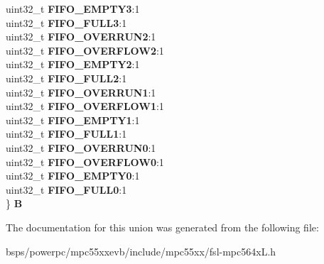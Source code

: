 \begin{DoxyCompactItemize}
\begin{tabbing}
\>uint32\_t {\bfseries FIFO\_EMPTY3}:1\\
\>uint32\_t {\bfseries FIFO\_FULL3}:1\\
\>uint32\_t {\bfseries FIFO\_OVERRUN2}:1\\
\>uint32\_t {\bfseries FIFO\_OVERFLOW2}:1\\
\>uint32\_t {\bfseries FIFO\_EMPTY2}:1\\
\>uint32\_t {\bfseries FIFO\_FULL2}:1\\
\>uint32\_t {\bfseries FIFO\_OVERRUN1}:1\\
\>uint32\_t {\bfseries FIFO\_OVERFLOW1}:1\\
\>uint32\_t {\bfseries FIFO\_EMPTY1}:1\\
\>uint32\_t {\bfseries FIFO\_FULL1}:1\\
\>uint32\_t {\bfseries FIFO\_OVERRUN0}:1\\
\>uint32\_t {\bfseries FIFO\_OVERFLOW0}:1\\
\>uint32\_t {\bfseries FIFO\_EMPTY0}:1\\
\>uint32\_t {\bfseries FIFO\_FULL0}:1\\
\} {\bfseries B}\\

\end{tabbing}\end{DoxyCompactItemize}


The documentation for this union was generated from the following file\+:\begin{DoxyCompactItemize}
\item 
bsps/powerpc/mpc55xxevb/include/mpc55xx/fsl-\/mpc564x\+L.\+h\end{DoxyCompactItemize}
